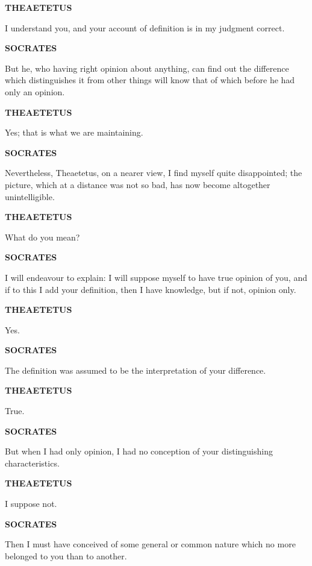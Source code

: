 \documentclass[11pt,letter]{article}
\begin{document}
\par \textbf{THEAETETUS}
\par   I understand you, and your account of definition is in my judgment correct.

\par \textbf{SOCRATES}
\par   But he, who having right opinion about anything, can find out the difference which distinguishes it from other things will know that of which before he had only an opinion.

\par \textbf{THEAETETUS}
\par   Yes; that is what we are maintaining.

\par \textbf{SOCRATES}
\par   Nevertheless, Theaetetus, on a nearer view, I find myself quite disappointed; the picture, which at a distance was not so bad, has now become altogether unintelligible.

\par \textbf{THEAETETUS}
\par   What do you mean?

\par \textbf{SOCRATES}
\par   I will endeavour to explain:  I will suppose myself to have true opinion of you, and if to this I add your definition, then I have knowledge, but if not, opinion only.

\par \textbf{THEAETETUS}
\par   Yes.

\par \textbf{SOCRATES}
\par   The definition was assumed to be the interpretation of your difference.

\par \textbf{THEAETETUS}
\par   True.

\par \textbf{SOCRATES}
\par   But when I had only opinion, I had no conception of your distinguishing characteristics.

\par \textbf{THEAETETUS}
\par   I suppose not.

\par \textbf{SOCRATES}
\par   Then I must have conceived of some general or common nature which no more belonged to you than to another.
\end{document}
